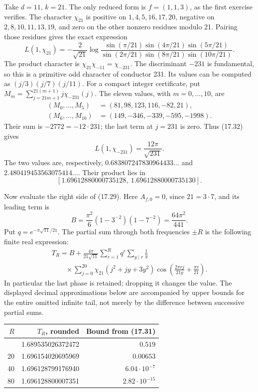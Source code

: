 \documentclass[
  11pt,
  a4paper,
]{article}
\newcounter{none} %
\begin{document}
Take \(d=11\), \(k=21\). The only reduced form is \(f=(1,1,3)\), as the
first exercise verifies. The character \(\chi_{21}\) is positive on
\(1,4,5,16,17,20\), negative on \(2,8,10,11,13,19\), and zero on the
other nonzero residues modulo 21. Pairing those residues gives the exact
expression \[
 L(1,\chi_{21})
 =-\frac2{\sqrt{21}}
   \log\frac{\sin(\pi/21)\sin(4\pi/21)\sin(5\pi/21)}
                 {\sin(2\pi/21)\sin(8\pi/21)\sin(10\pi/21)}.
 \tag{17.36}
\] The product character is \(\chi_{21}\chi_{-11}=\chi_{-231}\). The
discriminant \(-231\) is fundamental, so this is a primitive odd
character of conductor 231. Its values can be computed as
\((j/3)(j/7)(j/11)\). For a compact integer certificate, put
\(M_m=\sum_{j=21m+1}^{21(m+1)}j\chi_{-231}(j)\). The eleven values, with
\(m=0,\ldots,10\), are \[
 \begin{aligned}
 (M_0,\ldots,M_5)&=(81,98,123,116,-82,21),\\
 (M_6,\ldots,M_{10})&=(149,-346,-339,-595,-1998).
 \end{aligned}
 \tag{17.37}
\] Their sum is \(-2772=-12\cdot231\); the last term at \(j=231\) is
zero. Thus (17.32) gives \[
 L(1,\chi_{-231})=\frac{12\pi}{\sqrt{231}}.
 \tag{17.38}
\] The two values are, respectively, \(0.683807247830964433\ldots\) and
\(2.480419453563075414\ldots\). Their product lies in \[
 [1.69612880000735128,\ 1.69612880000735130].
 \tag{17.39}
\]

Now evaluate the right side of (17.29). Here \(A_{f,0}=0\), since
\(21=3\cdot7\), and its leading term is \[
 B=\frac{\pi^2}{6}(1-3^{-2})(1-7^{-2})
      =\frac{64\pi^2}{441}.
 \tag{17.40}
\] Put \(q=e^{-\pi\sqrt{11}/21}\). The partial sum through both
frequencies \(\pm R\) is the following finite real expression: \[
 \begin{aligned}
 T_R=B+\frac{4\pi}{21\sqrt{11}}
 \sum_{r=1}^{R}q^r\sum_{y\mid r}\frac1y\\
 \qquad\times
 \sum_{j=0}^{20}\chi_{21}(j^2+jy+3y^2)
 \cos\!\left(\frac{2\pi rj}{21y}+\frac{\pi r}{21}\right).
 \end{aligned}
 \tag{17.41}
\] In particular the last phase is retained; dropping it changes the
value. The displayed decimal approximations below are accompanied by
upper bounds for the entire omitted infinite tail, not merely by the
difference between successive partial sums.

{\def\LTcaptype{none} %
\begin{longtable}[]{@{}rrr@{}}
\toprule\noalign{}
\(R\) & \(T_R\), rounded & Bound from (17.31) \\
\midrule\noalign{}
\endhead
\bottomrule\noalign{}
\endlastfoot
10 & 1.689535026372472 & \(0.519\) \\
20 & 1.696154020695969 & \(0.00653\) \\
40 & 1.696128799176940 & \(6.04\cdot10^{-7}\) \\
80 & 1.696128800007351 & \(2.82\cdot10^{-15}\) \\
\end{longtable}
}
\end{document}
